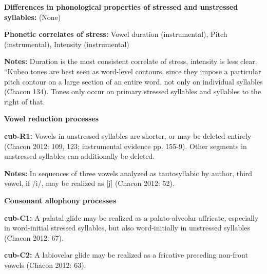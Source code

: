 \begin{styleBody}
\textbf{Differences in phonological properties of stressed and unstressed syllables:} (None)
\end{styleBody}

\begin{styleBody}
\textbf{Phonetic correlates of stress: }Vowel duration (instrumental), Pitch (instrumental), Intensity (instrumental)
\end{styleBody}

\begin{styleBody}
\textbf{Notes: }Duration is the most consistent correlate of stress, intensity is less clear. “Kubeo tones are best seen as word-level contours, since they impose a particular pitch contour on a large section of an entire word, not only on individual syllables{\textquotedbl} (Chacon 134). Tones only occur on primary stressed syllables and syllables to the right of that.
\end{styleBody}

\begin{styleBody}
\textbf{Vowel reduction processes}
\end{styleBody}

\begin{styleBody}
\textbf{cub-R1:} Vowels in unstressed syllables are shorter, or may be deleted entirely (Chacon 2012: 109, 123; instrumental evidence pp. 155-9). Other segments in unstressed syllables can additionally be deleted.
\end{styleBody}

\begin{styleBody}
\textbf{Notes: }In sequences of three vowels analyzed as tautosyllabic by author, third vowel, if /i/, may be realized as [j] (Chacon 2012: 52).
\end{styleBody}

\begin{styleBody}
\textbf{Consonant allophony processes}
\end{styleBody}

\begin{styleBody}
\textbf{cub-C1: }A palatal glide may be realized as a palato-alveolar affricate, especially in word-initial stressed syllables, but also word-initially in unstressed syllables (Chacon 2012: 67).
\end{styleBody}

\begin{styleBody}
\textbf{cub-C2: }A labiovelar glide may be realized as a fricative preceding non-front vowels (Chacon 2012: 63).
\end{styleBody}

